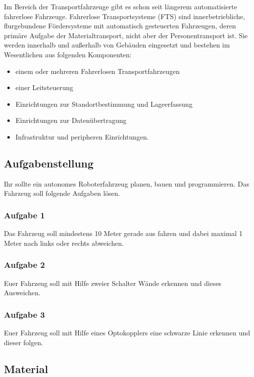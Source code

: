 Im Bereich der Transportfahrzeuge gibt es schon seit längerem automatisierte fahrerlose Fahrzeuge. Fahrerlose Transportsysteme (FTS) sind innerbetriebliche, flurgebundene Fördersysteme mit automatisch gesteuerten Fahrzeugen, deren primäre Aufgabe der Materialtransport, nicht aber der Personentransport ist. Sie werden innerhalb und außerhalb von Gebäuden eingesetzt und bestehen im Wesentlichen aus folgenden Komponenten: 
\begin{itemize}
\item einem oder mehreren Fahrerlosen Transportfahrzeugen
\item einer Leitsteuerung
\item Einrichtungen zur Standortbestimmung und Lageerfassung
\item Einrichtungen zur Datenübertragung
\item Infrastruktur und peripheren Einrichtungen.
\end{itemize}


\subsection{Aufgabenstellung}

Ihr sollte ein autonomes Roboterfahrzeug planen, bauen und programmieren. 
Das Fahrzeug soll folgende Aufgaben lösen.  

\subsubsection{Aufgabe 1}
Das Fahrzeug soll mindestens 10 Meter gerade aus fahren und dabei maximal 1 Meter nach links 
oder rechts abweichen.

\subsubsection{Aufgabe 2}
Euer Fahrzeug soll mit Hilfe zweier Schalter Wände erkennen und dieses Ausweichen. 

\subsubsection{Aufgabe 3}
Euer Fahrzeug soll mit Hilfe eines Optokopplers eine schwarze Linie erkennen und dieser folgen. 


\subsection{Material}

